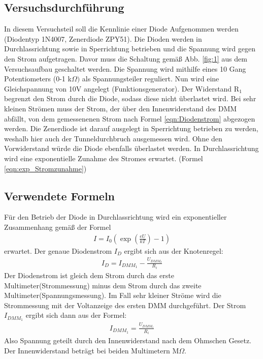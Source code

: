 \documentclass[12pt,a4paper]{article}
\begin{document}
\subsection{Versuchsdurchführung}
In diesem Versuchsteil soll die Kennlinie einer Diode Aufgenommen werden (Diodentyp 1N4007, Zenerdiode ZPY51). Die Dioden werden in Durchlassrichtung sowie in Sperrichtung betrieben und die Spannung wird gegen den Strom aufgetragen. Davor muss die Schaltung gemäß Abb. \ref{fig:1} aus dem Versuchsaufbau geschaltet werden. Die Spannung wird mithilfe eines 10 Gang Potentiometers (0-1 k$\Omega)$ als Spannungsteiler reguliert. Nun wird eine Gleichspannung von 10V angelegt (Funktionsgenerator). Der Widerstand R$_1$ begrenzt den Strom durch die Diode, sodass diese nicht überlastet wird. Bei sehr kleinen Strömen muss der Strom, der über den Innenwiderstand des DMM abfällt, von dem gemessenenen Strom nach Formel \ref{eqn:Diodenstrom} abgezogen werden. Die Zenerdiode ist darauf ausgelegt in Sperrichtung betrieben zu werden, weshalb hier auch der Tunneldurchbruch ausgemessen wird. Ohne den Vorwiderstand würde die Diode ebenfalls überlastet werden. In Durchlassrichtung wird eine exponentielle Zunahme des Stromes erwartet. (Formel \ref{eqn:exp_Stromzunahme})
\subsection{Verwendete Formeln}
Für den Betrieb der Diode in Durchlassrichtung wird ein exponentieller Zusammenhang gemäß der Formel
\begin{align}
I = I_0(\exp(\frac{eU}{kT})-1)
\label{eqn:exp_Stromzunahme}
\end{align}
erwartet.
Der genaue Diodenstrom $I_D$ ergibt sich aus der Knotenregel:
\begin{align}
I_D = I_{DMM_1}-\frac{U_{DMM_2}}{R_i}
\label{eqn:Diodenstrom}
\end{align}
Der Diodenstrom ist gleich dem Strom durch das erste Multimeter(Strommessung) minus dem Strom durch das zweite Multimeter(Spannungsmessung).
Im Fall sehr kleiner Ströme wird die Strommessung mit der Voltanzeige des ersten DMM durchgeführt.
Der Strom $I_{DMM_1}$ ergibt sich dann aus der Formel:
\begin{align}
I_{DMM_1} = \frac{U_{DMM_1}}{R_i}
\end{align}
Also Spannung geteilt durch den Innenwiderstand nach dem Ohmschen Gesetz.
Der Innenwiderstand beträgt bei beiden Multimetern \unit[10]{M$\Omega$}.
\end{document}

